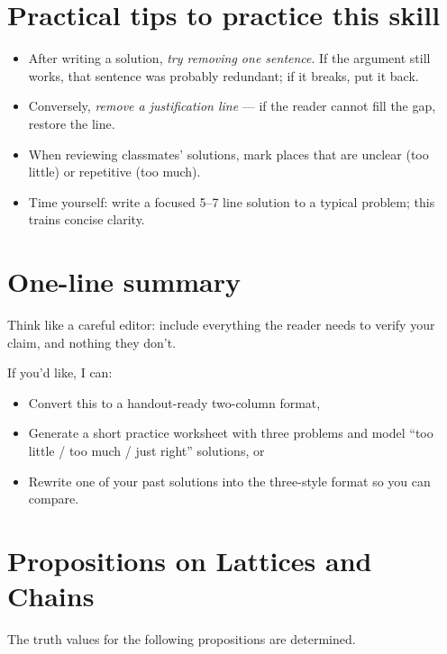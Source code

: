 \documentclass[10pt]{article}
\theoremstyle{definition}
\theoremstyle{plain}
\numberwithin{equation}{section}
\begin{document}
\section{Practical tips to practice this skill}
\begin{itemize}
  \item After writing a solution, \emph{try removing one sentence}. If the argument still works, that sentence was probably redundant; if it breaks, put it back.
  \item Conversely, \emph{remove a justification line} — if the reader cannot fill the gap, restore the line.
  \item When reviewing classmates' solutions, mark places that are unclear (too little) or repetitive (too much).
  \item Time yourself: write a focused 5--7 line solution to a typical problem; this trains concise clarity.
\end{itemize}

\section*{One-line summary}
Think like a careful editor: include everything the reader needs to verify your claim, and nothing they don’t.

\medskip
\noindent If you'd like, I can:
\begin{itemize}
  \item Convert this to a handout-ready two-column format,
  \item Generate a short practice worksheet with three problems and model ``too little / too much / just right'' solutions, or
  \item Rewrite one of your past solutions into the three-style format so you can compare.
\end{itemize}














\newpage

\section*{Propositions on Lattices and Chains}

The truth values for the following propositions are determined.
\end{document}
